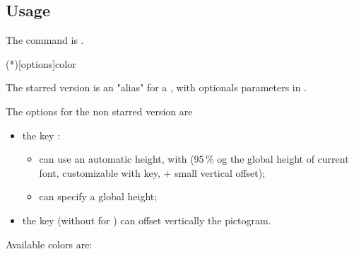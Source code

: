 \documentclass[english,11pt,a4paper]{article}
\begin{document}
\subsection{Usage}

The command is .

\begin{codehigh}[language=latex/latex2,style/main=cyan!10,style/code=cyan!10]
\ColorBelt(*)[options]{color}
\end{codehigh}

The starred version is an "alias" for a , with optionals parameters in \MontreCode{[...]}.

\medskip

The options for the non starred version are

\begin{itemize}[leftmargin=*]
	\item the key :
	\begin{itemize}
		\item can use an automatic height, with  (95\,\% og the global height of current font, customizable with  key, + small vertical offset);
		\item can specify a global height;
	\end{itemize}
	\item the key  (without  for ) can offset vertically the pictogram.
\end{itemize}

Available colors are:
\end{document}
